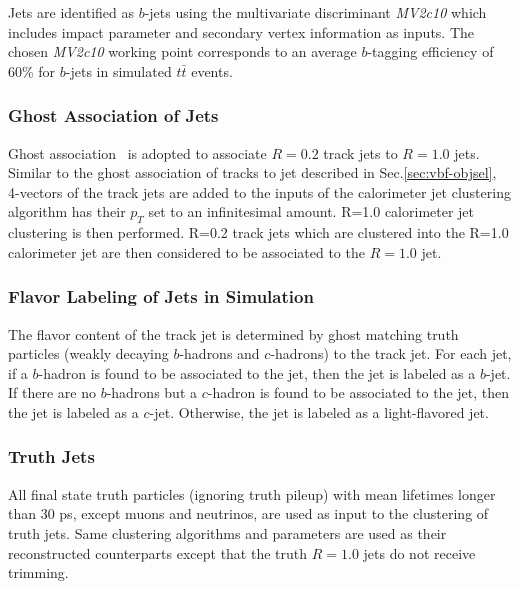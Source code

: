 Jets are identified as $b$-jets using the multivariate discriminant \textit{MV2c10} \cite{btag} which includes impact parameter and secondary vertex information as inputs. The chosen \textit{MV2c10} working point corresponds to an average $b$-tagging efficiency of 60\% for $b$-jets in simulated $t\bar{t}$ events.  

\subsubsection{Ghost Association of Jets}

Ghost association~\cite{area} is adopted to associate $R=0.2$ track jets to $R=1.0$ jets. Similar to the ghost association of tracks to jet described in Sec.\ref{sec:vbf-objsel}, 4-vectors of the track jets are added to the inputs of the calorimeter jet clustering algorithm has their $p_T$ set to an infinitesimal amount.  R=1.0 calorimeter jet clustering is then performed. R=0.2 track jets which are clustered into the R=1.0 calorimeter jet are then considered to be associated to the $R=1.0$ jet.  

\subsubsection{Flavor Labeling of Jets in Simulation}

The flavor content of the track jet is determined by ghost matching truth particles (weakly decaying $b$-hadrons and $c$-hadrons) to the track jet. For each jet, if a $b$-hadron is found to be associated to the jet, then the jet is labeled as a $b$-jet.  If there are no $b$-hadrons but a $c$-hadron is found to be associated to the jet, then the jet is labeled as a $c$-jet. Otherwise, the jet is labeled as a light-flavored jet. 

\subsubsection{Truth Jets}
All final state truth particles (ignoring truth pileup) with mean lifetimes longer than 30 ps, except muons and neutrinos, are used as input to the clustering of truth jets. Same clustering algorithms and parameters are used as their reconstructed counterparts except that the truth $R=1.0$ jets do not receive trimming. 

